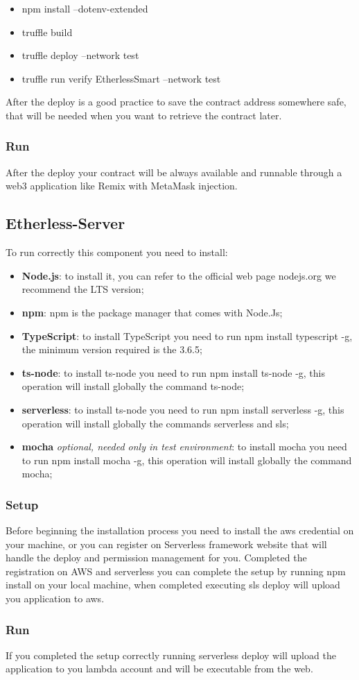 \begin{itemize}
    \item npm install --dotenv-extended
    \item truffle build
    \item truffle deploy --network test
    \item truffle run verify EtherlessSmart --network test
\end{itemize}
After the deploy is a good practice to save the contract address somewhere safe, that will be needed when you want to retrieve the contract later.
\subsubsection{Run}
After the deploy your contract will be always available and runnable through a web3 application like Remix with MetaMask injection.
\subsection{Etherless-Server}
To run correctly this component you need to install:
\begin{itemize}
    \item \textbf{Node.js}: to install it, you can refer to the official web page nodejs.org we recommend the LTS version;
    \item \textbf{npm}: npm is the package manager that comes with Node.Js;
    \item \textbf{TypeScript}: to install TypeScript you need to run npm install typescript -g, the minimum version required is the 3.6.5;
    \item \textbf{ts-node}: to install ts-node you need to run npm install ts-node -g, this operation will install globally the command ts-node;
    \item \textbf{serverless}: to install ts-node you need to run npm install serverless -g, this operation will install globally the commands serverless and sls;
    \item \textbf{mocha} \textit{optional, needed only in test environment}: to install mocha you need to run npm install mocha -g, this operation will install globally the command mocha;
\end{itemize}
\subsubsection{Setup}
Before beginning the installation process you need to install the aws credential on your machine, or you can register on Serverless framework website that will handle the deploy and permission management for you.
Completed the registration on AWS and serverless you can complete the setup by running npm install on your local machine, when completed executing sls deploy will upload you application to aws.
\subsubsection{Run}
If you completed the setup correctly running serverless deploy will upload the application to you lambda account and will be executable from the web.
